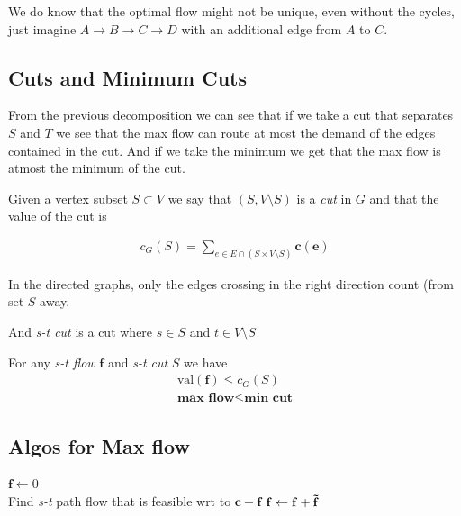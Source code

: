We do know that the optimal flow might not be unique, even without the cycles, just imagine $A \rightarrow B \rightarrow C \rightarrow D$ with an additional edge from $A$ to $C$.


\subsection{Cuts and Minimum Cuts}

From the previous decomposition we can see that if we take a cut that separates $S$ and $T$ we see that the max flow can route at most the demand of the edges contained in the cut. And if we take the minimum we get that the max flow is atmost the minimum of the cut.



\begin{definicija}
    Given a vertex subset $S \subset V$ we say that $(S, V \setminus S)$ is a \emph{cut} in $G$ and that the value of the cut is 
    
    \begin{align}
        c_G (S) = \sum_{e\in E \cap (S \times V \setminus S) } \mathbf{c(e)}
    \end{align}

    In the directed graphs, only the edges crossing in the right direction count (from set $S$ away.
\end{definicija}

\begin{definicija}
    And \emph{s-t cut} is a cut where $s \in S$ and $t \in V\setminus S$
\end{definicija}

\begin{izrek}
    For any \textit{s-t flow} $\mathbf{f}$ and \textit{s-t cut} $S$ we have
    \begin{align}
        \text{val}(\mathbf{f}) \leq c_G(S)\\
        \textbf{max flow} \leq \textbf{min cut}
    \end{align}
\end{izrek}

\obvs


\subsection{Algos for Max flow}

\begin{algorithm}
\caption{First try at algo}\label{alg:first}
\begin{algorithmic}
\State $\mathbf{f} \gets 0$
\While{}\\
    Find \emph{s-t} path flow that is feasible wrt to $\mathbf{c - f}$
    \State $ \mathbf{f} \gets \mathbf{f + \Tilde{\mathbf{f}}}$
\EndWhile
\end{algorithmic}
\end{algorithm}

